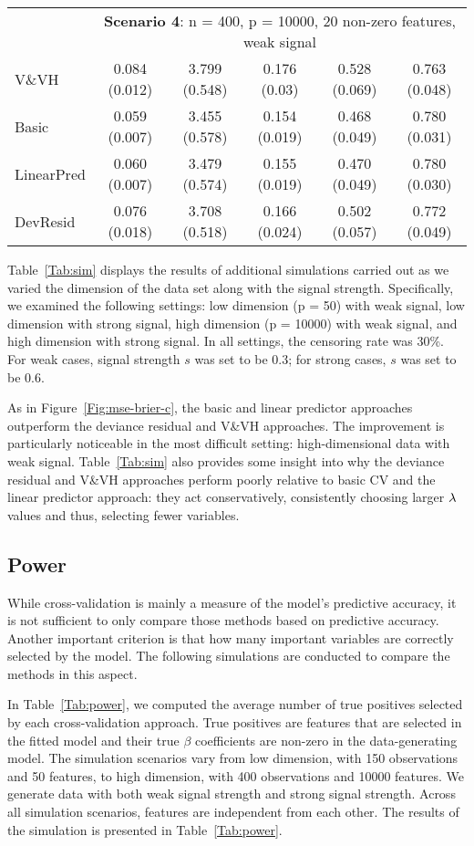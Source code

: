 \begin{table}[!htb]
\begin{tabular}[t]{lccccc}
&\multicolumn{5}{c}{\textbf{Scenario 4}: n = 400, p = 10000, 20 non-zero features, weak signal}\\
\cline{2-6}
V\&VH  & 0.084 (0.012) & 3.799 (0.548) & 0.176 (0.03) & 0.528 (0.069) & 0.763 (0.048) \\
Basic  & 0.059 (0.007) & 3.455 (0.578) & 0.154 (0.019) & 0.468 (0.049) & 0.780 (0.031) \\
LinearPred  & 0.060 (0.007) & 3.479 (0.574) & 0.155 (0.019) & 0.470 (0.049) & 0.780 (0.030) \\
DevResid  & 0.076 (0.018) & 3.708 (0.518) & 0.166 (0.024) & 0.502 (0.057) & 0.772 (0.049) \\
\bottomrule
\end{tabular}
\end{table}

Table~\ref{Tab:sim} displays the results of additional simulations carried out as we varied the dimension of the data set along with the signal strength.  Specifically, we examined the following settings: low dimension (p = 50) with weak signal, low dimension with strong signal, high dimension (p = 10000) with weak signal, and high dimension with strong signal. In all settings, the censoring rate was 30\%. For weak cases, signal strength $s$ was set to be 0.3; for strong cases, $s$ was set to be 0.6. 

As in Figure~\ref{Fig:mse-brier-c}, the basic and linear predictor approaches outperform the deviance residual and V\&VH approaches.  The improvement is particularly noticeable in the most difficult setting: high-dimensional data with weak signal.  Table~\ref{Tab:sim} also provides some insight into why the deviance residual and V\&VH approaches perform poorly relative to basic CV and the linear predictor approach: they act conservatively, consistently choosing larger $\lambda$ values and thus, selecting fewer variables.

\subsection{Power}
\label{Sec:power}
While cross-validation is mainly a measure of the model's predictive accuracy, it is not sufficient to only compare those methods based on predictive accuracy. Another important criterion is that how many important variables are correctly selected by the model. The following simulations are conducted to compare the methods in this aspect.

In Table~\ref{Tab:power}, we computed the average number of true positives selected by each cross-validation approach. True positives are features that are selected in the fitted model and their true $\beta$ coefficients are non-zero in the data-generating model. The simulation scenarios vary from low dimension, with 150 observations and 50 features, to high dimension, with 400 observations and 10000 features. We generate data with both weak signal strength and strong signal strength. Across all simulation scenarios, features are independent from each other. The results of the simulation is presented in Table~\ref{Tab:power}.

